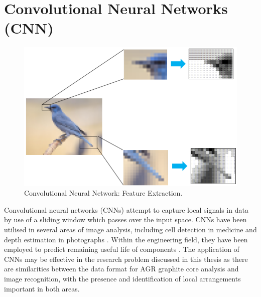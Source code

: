 






\section{Convolutional Neural Networks (CNN)} \label{convolution}

\begin{figure}[p]
	\centering
	\includegraphics[scale=0.75]{Figures/cnn_feature.png}
	\caption{Convolutional Neural Network: Feature Extraction.}
	\label{fig:cnn_feature}
\end{figure}

Convolutional neural networks (CNNs) attempt to capture local signals in data by use of a sliding window which passes over the input space. CNNs have been utilised in several areas of image analysis, including cell detection in medicine \cite{xie2015beyond} and depth estimation in photographs \cite{li2015depth}. Within the engineering field, they have been employed to predict remaining useful life of components \cite{babu2016deep}. The application of CNNs may be effective in the research problem discussed in this thesis as there are similarities between the data format for AGR graphite core analysis and image recognition, with the presence and identification of local arrangements important in both areas.
\\

